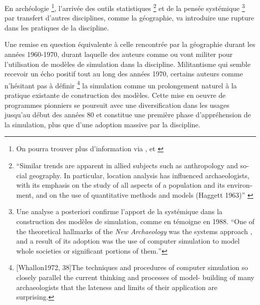 En archéologie \footnote{On pourra trouver plus d'information via \autocite{Kohler2011}, et \autocite{Lake2013}}, l'arrivée des outils statistiques \footnote{\foreignquote{english}{Similar trends are apparent in allied subjects such as anthropology and social geography. In particular, location analysis has influenced archaeologists, with its emphasis on the study of all aspects of a population and its environment, and on the use of quantitative methods and models (Haggett 1963)} \autocite{Doran1970}} et de la pensée systémique \autocite{Flannery1968, Binford1968} \footnote{Une analyse a posteriori confirme l'apport de la systémique dans la construction des modèles de simulation, comme en témoigne \textcite{Aldenderfer1998} en 1988. \foreignquote{english}{One of the theoretical hallmarks of the \textit{New Archaeology} was the systems approach \autocite{Aldenderfer1991}, and a result of its adoption was the use of computer simulation to model whole societies or significant portions of them.}} par transfert d'autres disciplines, comme la géographie, va introduire une rupture dans les pratiques de la discipline. 


Une remise en question équivalente à celle rencontrée par la géographie durant les années 1960-1970, durant laquelle des auteurs comme \textcite{Clarke1968} ou \textcite{Doran1970} vont militer pour l'utilisation de modèles de simulation dans la discipline. Militantisme qui semble recevoir un écho positif tout au long des années 1970, certains auteurs comme \textcite[38]{Whallon1972} n'hésitant pas à définir \footnote{ [Whallon1972, 38]{The techniques and procedures of computer simulation so closely parallel the current thinking and processes of model- building of many archaeologists that the lateness and limits of their application are surprising.}} la simulation comme un prolongement naturel à la pratique existante de construction des modèles. Cette mise en oeuvre de programmes pionniers se poursuit avec une diversification dans les usages jusqu'au début des années 80 et constitue une première phase d'appréhension de la simulation, plus que d'une adoption massive par la discipline. \autocite{Lake2013}

